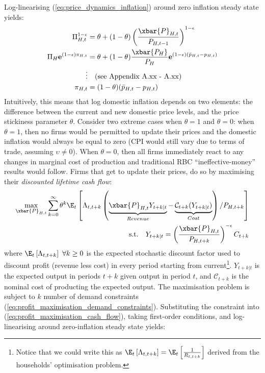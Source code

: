 Log-linearising (\ref{eq:price_dynamics_inflation}) around zero inflation steady state yields:
\begin{align}
    \Pi_{H,t}^{1-\epsilon} &= \theta + (1-\theta)\left(\frac{\xbar{P}_{H,t}}{P_{H,t-1}}\right)^{1-\epsilon} \\
    \Pi_H \mathbf{e}^{(1-\epsilon)\pi_{H,t}} &= \theta + (1-\theta)\frac{\xbar{P_H}}{P_H}\mathbf{e}^{(1-\epsilon)(\bar{p}_{H,t} - p_{H,t})} \\
    \vdots & \quad \text{(see Appendix A.xx - A.xx)} \\
    \pi_{H,t} &= (1-\theta)(\bar{p}_{H,t} - p_{H,t})
\end{align}
Intuitively, this means that log domestic inflation depends on two elements: the difference between the current and new domestic price levels, and the price stickiness parameter $\theta$. Consider two extreme cases when $\theta = 1$ and $\theta = 0$: when $\theta = 1$, then no firms would be permitted to update their prices and the domestic inflation would always be equal to zero (CPI would still vary due to terms of trade, assuming $\upsilon \ne 0$). When $\theta = 0$, then all firms immediately react to any changes in marginal cost of production and traditional RBC ``ineffective-money'' results would follow. Firms that get to update their prices, do so by maximising their \textit{discounted lifetime cash flow}:
\begin{align}
    \max_{\xbar{P}_{H,t}} \sum_{k=0}^{\infty} \theta^k \E_t \left[\Lambda_{t,t+k} \left( \underbrace{\xbar{P}_{H,t} Y_{t+k|t}}_{Revenue} - \underbrace{\mathcal{C}_{t+k}(Y_{t+k|t})}_{Cost} \right) / P_{H,t+k} \right] \label{eq:profit_maximisation_cash_flow}\\
    \text{s.t.} \quad Y_{t+k|t} = \left(\frac{\xbar{P}_{H,t}}{P_{H,t+k}}\right)^{-\epsilon} C_{t+k} \label{eq:profit_maximisation_demand_constraints}
\end{align}
where $\E_t \left[\Lambda_{t,t+k}\right]\ \forall k \geq 0$ is the expected stochastic discount factor used to discount profit (revenue less cost) in every period starting from current\footnote{Notice that we could write this as $\E_t \left[\Lambda_{t,t+k}\right]=\E_t \left[\frac{1}{R_{t, t+k}}\right]$ derived from the households' optimisation problem.}. $Y_{t+k|t}$ is the expected output in periods $t+k$ given output in period $t$, and $\mathcal{C}_{t+k}$ is the nominal cost of producting the expected output. The maximisation problem is subject to $k$ number of demand constraints (\ref{eq:profit_maximisation_demand_constraints}). Substituting the constraint into (\ref{eq:profit_maximisation_cash_flow}), taking first-order conditions, and log-linearising around zero-inflation steady state yields:

